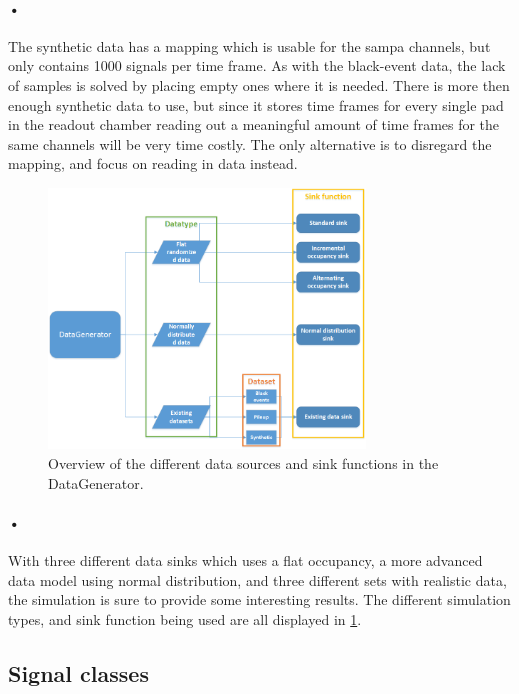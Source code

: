 \documentclass[a4paper, 12pt]{report}\dfrac{\right }{•}
\begin{document}
\paragraph{•}
The synthetic data has a mapping which is usable for the \gls{sampa} channels, but only contains 1000 signals per time frame.
As with the black-event data, the lack of samples is solved by placing empty ones where it is needed.
There is more then enough synthetic data to use, but since it stores time frames for every single pad in the readout chamber reading out a meaningful amount of time frames for the same channels will be very time costly.
The only alternative is to disregard the mapping, and focus on reading in data instead.

\begin{figure}[h!]
	\centering
		\includegraphics[width=0.75\textwidth]{images/dg-overview.png}
		\caption{Overview of the different data sources and sink functions in the DataGenerator.}
		\label{fig:dg-overview}
\end{figure}

\paragraph{•}
With three different data sinks which uses a flat occupancy, a more advanced data model using normal distribution, and three different sets with realistic data, the simulation is sure to provide some interesting results.
The different simulation types, and sink function being used are all displayed in \ref{fig:dg-overview}.

\subsection{Signal classes}
\label{subsec:signal-classes}
\end{document}
